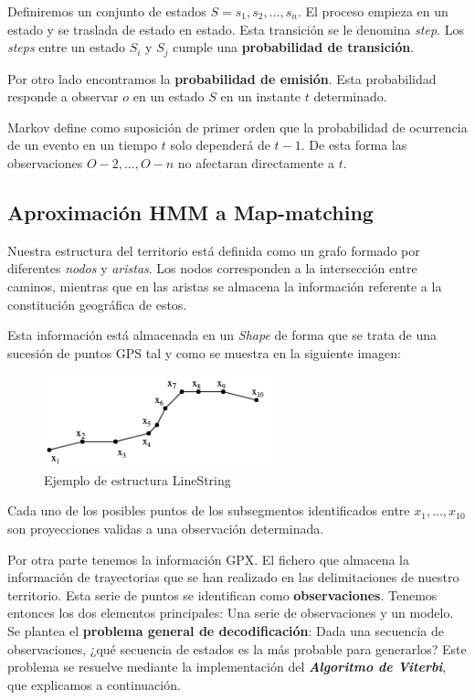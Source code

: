 Definiremos un conjunto de estados $ S = {s_{1}, s_{2}, . . . , s_{n}}. $ El proceso empieza en un estado 
y se traslada de estado en estado. Esta transición se le denomina \textit{step}. Los \textit{steps} entre 
un estado $S_{i}$  y $S_{j}$ 
cumple una \textbf{probabilidad de transición}.

Por otro lado encontramos la \textbf{probabilidad de emisión}. Esta probabilidad responde a observar 
$o$ en un estado $S$ en un instante $t$ determinado.

Markov define como suposición de primer orden que la probabilidad de ocurrencia de un evento en 
un tiempo $t$ solo dependerá de $t-1$. De esta forma las observaciones ${O-2,..., O-n}$ no 
afectaran directamente a $t$.

\subsection{Aproximación \ac{HMM} a Map-matching}
Nuestra estructura del territorio está definida como un grafo formado por diferentes \textit{nodos} 
y \textit{aristas}. Los nodos corresponden a la intersección entre caminos, mientras que en las aristas 
se almacena la información referente a la constitución geográfica de estos.

Esta información está almacenada en un \textit{Shape} de forma que se trata de una sucesión de puntos 
\ac{GPS} tal 
y como se muestra en la siguiente imagen:
\begin{figure}[htb]
\begin{center}
\includegraphics[width=0.6\textwidth]{./Imagenes/LineString.png}
\caption{Ejemplo de estructura LineString}
\label{LineString}
\end{center}
\end{figure}

Cada uno de los posibles puntos de los subsegmentos identificados entre $x_{1}, ..., x_{10}$ son proyecciones 
validas a una observación determinada.

Por otra parte tenemos la información \ac{GPX}. El fichero que almacena la información de trayectorias que 
se han realizado en las delimitaciones de nuestro territorio. Esta serie de puntos se identifican como 
\textbf{observaciones}. Tenemos entonces los dos elementos principales: Una serie de observaciones y 
un modelo. Se plantea el \textbf{problema general de decodificación}: Dada una secuencia de observaciones, 
¿qué secuencia de estados es la más probable para generarlos? Este problema se resuelve mediante la 
implementación del \textbf{\textit{Algoritmo de Viterbi}}, que explicamos a continuación.

